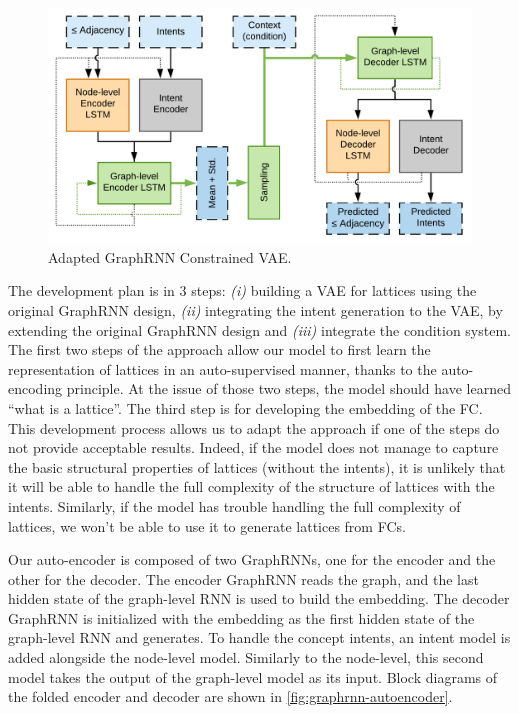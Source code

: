 \begin{figure}
    \centering
    \includegraphics[keepaspectratio, width=.9\textwidth]{Figures/Ch1/grnn_full_.png}
    \caption{Adapted GraphRNN Constrained VAE.}
    \label{fig:graphrnn-cvae}
\end{figure}

The development plan is in 3 steps: \textit{(i)} building a VAE for lattices using the original GraphRNN design, \textit{(ii)} integrating the intent generation to the VAE, by extending the original GraphRNN design and \textit{(iii)} integrate the condition system.
The first two steps of the approach allow our model to first learn the representation of lattices in an auto-supervised manner, thanks to the auto-encoding principle.
At the issue of those two steps, the model should have learned ``what is a lattice''.
The third step is for developing the embedding of the FC.
This development process allows us to adapt the approach if one of the steps do not provide acceptable results.
Indeed, if the model does not manage to capture the basic structural properties of lattices (without the intents), it is unlikely that it will be able to handle the full complexity of the structure of lattices with the intents.
Similarly, if the model has trouble handling the full complexity of lattices, we won't be able to use it to generate lattices from FCs.


Our auto-encoder is composed of two GraphRNNs, one for the encoder and the other for the decoder.
The encoder GraphRNN reads the graph, and the last hidden state of the graph-level RNN is used to build the embedding.
The decoder GraphRNN is initialized with the embedding as the first hidden state of the graph-level RNN and generates.
To handle the concept intents, an intent model is added alongside the node-level model.
Similarly to the node-level, this second model takes the output of the graph-level model as its input.
Block diagrams of the folded encoder and decoder are shown in \cref{fig:graphrnn-autoencoder}.

